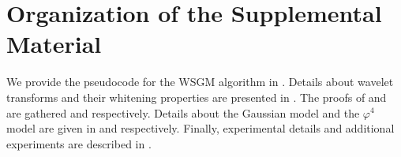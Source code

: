 \documentclass{article}
\begin{document}










\section{Organization of the Supplemental Material}

We provide the pseudocode for the WSGM algorithm in
. Details about wavelet transforms and their whitening
properties are presented in .  The proofs of
 and  are gathered
 and  respectively. Details about
the Gaussian model and the $\varphi^4$ model are given in
 and  respectively. Finally,
experimental details and additional experiments are described in
.
\end{document}
